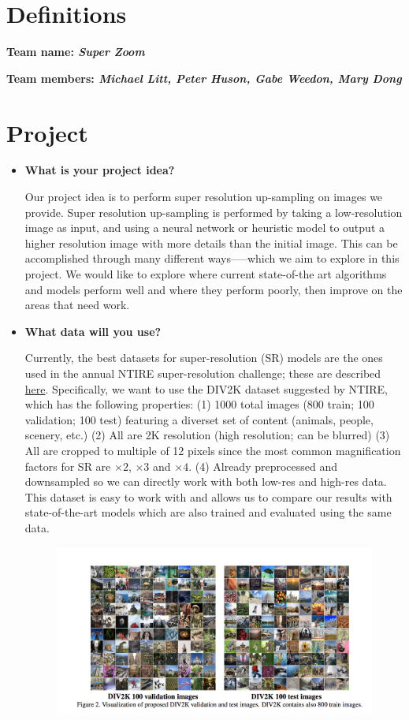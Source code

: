 \section*{Definitions}

\textbf{Team name: \emph{Super Zoom}}

\textbf{Team members: \emph{Michael Litt, Peter Huson, Gabe Weedon, Mary Dong}}

\section*{Project}
\begin{itemize}
  \item \textbf{What is your project idea?}
  
Our project idea is to perform super resolution up-sampling on images we provide. Super resolution up-sampling is performed by taking a low-resolution image as input, and using a neural network or heuristic model to output a higher resolution image with more details than the initial image. This can be accomplished through many different ways—--which we aim to explore in this project. We would like to explore where current state-of-the art algorithms and models perform well and where they perform poorly, then improve on the areas that need work. 

  \item \textbf{What data will you use?}
  
Currently, the best datasets for super-resolution (SR) models are the ones used in the annual NTIRE super-resolution challenge; these are described  \href{http://www.vision.ee.ethz.ch/~timofter/publications/Agustsson-CVPRW-2017.pdf}{here}. Specifically, we want to use the DIV2K dataset suggested by NTIRE, which has the following properties: (1) 1000 total images (800 train; 100 validation; 100 test) featuring a diverset set of content (animals, people, scenery, etc.) (2) All are 2K resolution (high resolution; can be blurred) (3) All are cropped to multiple of 12 pixels since the most common magnification factors for SR are $\times2$, $\times3$ and $\times4$. (4) Already preprocessed and downsampled so we can directly work with both low-res and high-res data. This dataset is easy to work with and allows us to compare our results with state-of-the-art models which are also trained and evaluated using the same data.
\begin{figure}[H]
    \centering
    \includegraphics[width=13cm]{imgs.png}
\end{figure}


\end{itemize}
